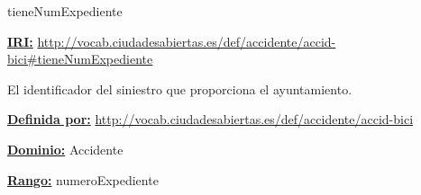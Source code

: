 \begin{mybox}{tieneNumExpediente}
\begin{flushleft}
\underline{\textbf{IRI:}}
\url{http://vocab.ciudadesabiertas.es/def/accidente/accid-bici#tieneNumExpediente}
\newline

El identificador del siniestro que proporciona el ayuntamiento.
\newline

\underline{\textbf{Definida por:}}
\newline \url{http://vocab.ciudadesabiertas.es/def/accidente/accid-bici}
\newline

\underline{\textbf{Dominio:}} 
\newline Accidente
\newline

\underline{\textbf{Rango:}} 
\newline numeroExpediente
\newline

\end{flushleft}
\end{mybox}



